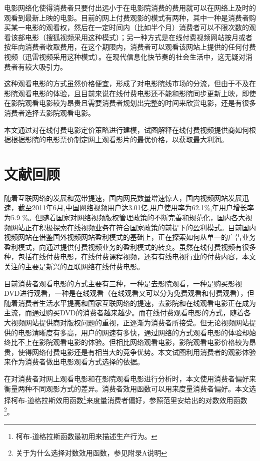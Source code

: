 \documentclass[paper=a4, fontsize=10.5pt]{scrartcl} %
\numberwithin{equation}{section} %
\numberwithin{figure}{section} %
\numberwithin{table}{section} %
\begin{document}
\begin{CJK}{UTF8}{gbsn}
电影网络化使得消费者只要付出远小于在电影院消费的费用就可以在网络上及时的观看到最新上映的电影。目前的网上付费观影的模式有两种，其中一种是消费者购买某一电影的观看权，然后在一定时间内（比如半个月）消费者可以不限次数的观看该部电影（搜狐视频采用这种模式）；另一种方式是在线付费视频网站按月或者按年向消费者收取费用，在这个期限内，消费者可以观看该网站上提供的任何付费视频（迅雷视频采用这种模式）。在现代信息化快节奏的社会生活中，这无疑对消费者有较大吸引力。

这种观看电影的方式虽然价格便宜，形成了对电影院线市场的分流，但由于不及在影院观看电影的体验，且目前来说在线付费电影还不能和影院同步更新上映，即使在影院观看电影较为昂贵且需要消费者规划出完整的时间来欣赏电影，还是有很多消费者选择去影院观看电影。

本文通过对在线付费电影定价策略进行建模，试图解释在线付费视频提供商如何根据根据影院的电影票价制定网上观看影片的最优价格，以获取最大利润。

\section{文献回顾}
随着互联网络的发展和宽带提速，国内网民数量增速惊人，国内视频网站发展迅速，截至2011年6月,中国网络视频用户达3.01亿,用户使用率为62.1\%,年用户增长率为5.9 \%\cite{GaoHui2012}。但随着国家对网络视频版权管理政策的不断完善和规范化，国内各大视频网站正在积极探索在线视频业务在符合国家政策的前提下的盈利模式。目前国内视频网站在借鉴国外视频网站盈利模式的基础上，正在探索如何从单一的广告业务盈利模式，向通过提供付费视频业务的盈利模式的转变\cite{GuoTie2011netflix}。虽然在线付费视频有很多种，包括在线付费电影，在线付费课程视频，还有有线电视行业的付费内容，本文关注的主要是新兴的互联网络在线付费电影。

目前消费者观看电影的方式主要有三种，一种是去影院观看，一种是购买影视DVD进行观看，一种是在线观看（在线观看又可以分为免费观看和付费观看），但随着消费者生活水平提高和国家互联网络的提速，去影院和在线观看电影正在成为主流，而通过购买DVD的消费者越来越少。而在线付费观看电影的方式，随着各大视频网站提供商对版权问题的重视，正逐渐为消费者所接受。但无论视频网站提供的电影清晰度有多高，用户的网速有多快，通过网络的方式观看电影的体验却始终比不上在影院观看电影的体验。但相比网络观看电影，影院观看电影价格较为昂贵，使得网络付费电影还是有相当大的竞争优势。本文试图利用消费者的观影体验来作为消费者做出电影观看方式选择的依据。

在对消费者对网上观看电影和在影院观看电影进行分析时，本文使用消费者偏好来衡量两种不同观影方式的差异。消费者效用函数可以用来度量消费者偏好。本文选择柯布-道格拉斯效用函数\footnote{柯布-道格拉斯函数最初用来描述生产行为。}来度量消费者偏好，参照范里安给出的对数效用函数\footnote{关于为什么选择对数效用函数，参见附录A说明}\cite{Varian2007}。


\end{CJK}
\end{document}
